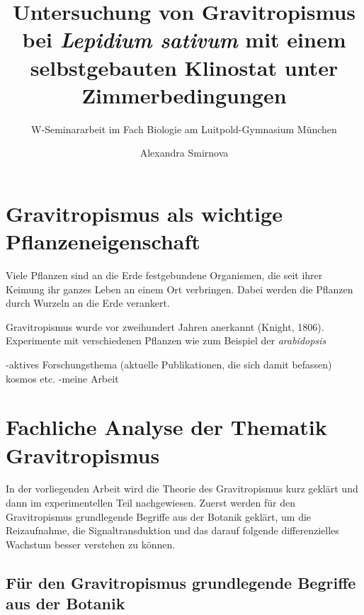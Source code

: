 \documentclass[
a4paper, 
11pt, 
ngerman,
listof=totoc,
bibliography=totocnumbered,
abstracton
]{scrreprt}
\title{Untersuchung von Gravitropismus bei \emph{Lepidium sativum} mit einem selbstgebauten Klinostat unter Zimmerbedingungen}
\subtitle{W-Seminararbeit im Fach Biologie am Luitpold-Gymnasium München}
\author{Alexandra Smirnova}
\begin{document}
	
\begingroup
\renewcommand*{\chapterpagestyle}{empty}
\pagestyle{empty}
\maketitle
\tableofcontents
\clearpage
\endgroup
	
\renewcommand\abstractname{Abstract}
\begin{abstract}


	
\end{abstract}


\chapter{Gravitropismus als wichtige Pflanzeneigenschaft}

Viele Pflanzen sind an die Erde festgebundene Organismen, die seit ihrer Keimung ihr ganzes Leben an einem Ort verbringen. Dabei werden die Pflanzen durch Wurzeln an die Erde verankert. 

Gravitropismus wurde vor zweihundert Jahren anerkannt (Knight, 1806). Experimente mit verschiedenen Pflanzen wie zum Beispiel der \emph{arabidopsis}

-aktives Forschungsthema (aktuelle Publikationen, die sich damit befassen) kosmos etc.
-meine Arbeit







\chapter{Fachliche Analyse der Thematik Gravitropismus}

In der vorliegenden Arbeit wird die Theorie des Gravitropismus kurz geklärt und dann im experimentellen Teil nachgewiesen. Zuerst werden für den Gravitropismus grundlegende Begriffe aus der Botanik geklärt, um die Reizaufnahme, die Signaltransduktion und das darauf folgende differenzielles Wachstum besser verstehen zu können.  



\section{Für den Gravitropismus grundlegende Begriffe aus der Botanik}
\end{document}
